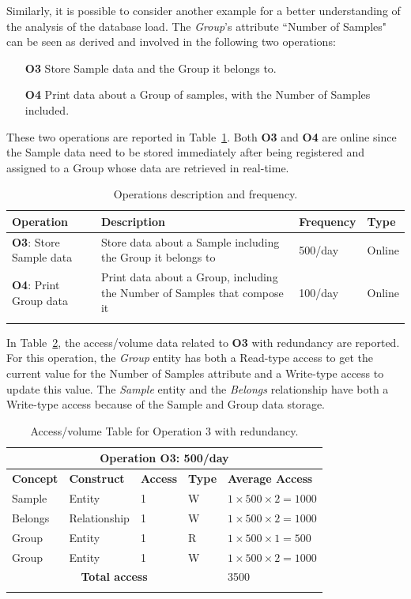 Similarly, it is possible to consider another example for a better understanding of the analysis of the database load. The \textit{Group}'s attribute ``Number of Samples" can be seen as derived and involved in the following two operations:
\begin{itemize}
    \item[\textbf{O3}] Store Sample data and the Group it belongs to.
    \item[\textbf{O4}] Print data about a Group of samples, with the Number of Samples included.
\end{itemize}
These two operations are reported in Table~\ref{table:10}. Both \textbf{O3} and \textbf{O4} are online since the Sample data need to be stored immediately after being registered and assigned to a Group whose data are retrieved in real-time.
\begin{longtable}[width=\textwidth]{|p{}|p{} |p{}|p{}|}
\hline
\textbf{Operation} & \textbf{Description} & \textbf{Frequency} & \textbf{Type} \\
\hline
\textbf{O3}: Store Sample data & Store data about a Sample including the Group it belongs to &500/day &Online \\
\hline
\textbf{O4}: Print Group data & Print data about a Group, including the Number of Samples that compose it &100/day &Online \\
\hline

\caption{Operations description and frequency.}
\label{table:10}
\end{longtable}

In Table~\ref{table:11}, the access/volume data related to \textbf{O3} with redundancy are reported. For this operation, the \textit{Group} entity has both a Read-type access to get the current value for the Number of Samples attribute and a Write-type access to update this value. The \textit{Sample} entity and the \textit{Belongs} relationship have both a Write-type access because of the Sample and Group data storage.

\begin{longtable}{|p{}|p{}|p{}|p{}|p{}|}
\hline
\multicolumn{5}{|c|}{\textbf{Operation O3: 500/day}}\\\hline
\textbf{Concept} & \textbf{Construct} & \textbf{Access} & \textbf{Type} & \textbf{Average Access} \\
\hline
Sample & Entity & 1 & W & $1 \times 500 \times 2 = 1000$\\
Belongs & Relationship & 1 & W & $1 \times 500 \times 2 = 1000$\\
Group & Entity & 1 & R & $1 \times 500 \times 1 = 500$\\
Group & Entity & 1 & W & $1 \times 500 \times 2 = 1000$\\
\hline
\multicolumn{4}{|c|}{\textbf{Total access}} & 3500\\
\hline
\caption{Access/volume Table for Operation 3 with redundancy.}
\label{table:11}
\end{longtable}

